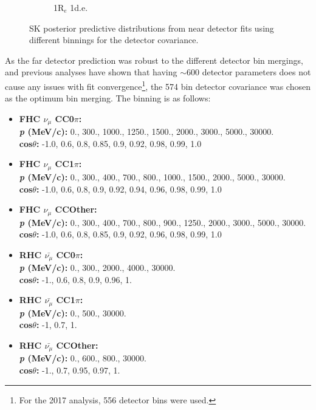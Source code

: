\begin{figure}
\begin{subfigure}{.49\textwidth}
  \caption{1R$_{e}$ 1d.e.}
\end{subfigure}
\caption{SK posterior predictive distributions from near detector fits using different binnings for the detector covariance.}
\label{fig:detbinSK}
\end{figure}

As the far detector prediction was robust to the different detector bin mergings, and previous analyses have shown that having $\sim600$ detector parameters does not cause any issues with fit convergence\footnote{For the 2017 analysis, 556 detector bins were used.}, the 574 bin detector covariance was chosen as the optimum bin merging. The binning is as follows:

\begin{itemize}
\setlength\itemsep{1mm}
\item \textbf{FHC $\nu_{\mu}$ CC0$\pi$:}\\
\textbf{\textit{p} (MeV/c):} 0., 300., 1000., 1250., 1500., 2000., 3000., 5000., 30000.\\
\textbf{cos$\theta$:} -1.0, 0.6, 0.8, 0.85, 0.9, 0.92, 0.98, 0.99, 1.0

\item \textbf{FHC $\nu_{\mu}$ CC1$\pi$:}\\
\textbf{\textit{p} (MeV/c):} 0., 300., 400., 700., 800., 1000., 1500., 2000., 5000., 30000.\\
\textbf{cos$\theta$:} -1.0, 0.6, 0.8, 0.9, 0.92, 0.94, 0.96, 0.98, 0.99, 1.0

\item \textbf{FHC $\nu_{\mu}$ CCOther:} \\
\textbf{\textit{p} (MeV/c):} 0., 300., 400., 700., 800., 900., 1250., 2000., 3000., 5000., 30000.\\
\textbf{cos$\theta$:} -1.0, 0.6, 0.8, 0.85, 0.9, 0.92, 0.96, 0.98, 0.99, 1.0

\item \textbf{RHC $\bar{\nu_{\mu}}$ CC0$\pi$:}\\
\textbf{\textit{p} (MeV/c):} 0., 300., 2000., 4000., 30000.\\
\textbf{cos$\theta$:} -1., 0.6, 0.8, 0.9, 0.96, 1.

\item \textbf{RHC $\bar{\nu_{\mu}}$ CC1$\pi$:}\\
\textbf{\textit{p} (MeV/c):} 0., 500., 30000.\\
\textbf{cos$\theta$:} -1, 0.7, 1.

\item \textbf{RHC $\bar{\nu_{\mu}}$ CCOther:}\\
\textbf{\textit{p} (MeV/c):} 0., 600., 800., 30000.\\
\textbf{cos$\theta$:} -1., 0.7, 0.95, 0.97, 1.


\end{itemize}
